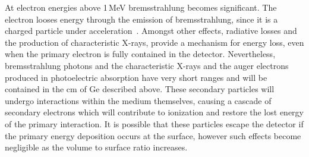 At electron energies above 1\,MeV bremsstrahlung becomes significant. The electron looses energy through the emission of bremsstrahlung, since it is a charged particle under acceleration~\cite{bremsstrahlung,larmor}. Amongst other effects, radiative losses and the production of characteristic X-rays, provide a mechanism for energy loss, even when the primary electron is fully contained in the detector. Nevertheless, bremsstrahlung photons and the characteristic X-rays and the auger electrons produced in photoelectric absorption have very short ranges and will be contained in the cm of Ge described above. These secondary particles will undergo interactions within the medium themselves, causing a cascade of secondary electrons which will contribute to ionization and restore the lost energy of the primary interaction. It is possible that these particles escape the detector if the primary energy deposition occurs at the surface, however such effects become negligible as the volume to surface ratio increases. 

